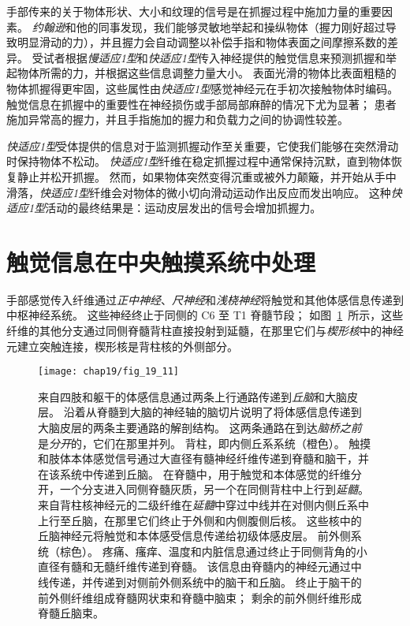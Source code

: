 手部传来的关于物体形状、大小和纹理的信号是在抓握过程中施加力量的重要因素。
\textit{约翰逊}和他的同事发现，我们能够灵敏地举起和操纵物体（握力刚好超过导致明显滑动的力），并且握力会自动调整以补偿手指和物体表面之间摩擦系数的差异。
受试者根据\textit{慢适应1型}和\textit{快适应1型}传入神经提供的触觉信息来预测抓握和举起物体所需的力，并根据这些信息调整力量大小。
表面光滑的物体比表面粗糙的物体抓握得更牢固，这些属性由\textit{快适应1型}感觉神经元在手初次接触物体时编码。
触觉信息在抓握中的重要性在神经损伤或手部局部麻醉的情况下尤为显著；
患者施加异常高的握力，并且手指施加的握力和负载力之间的协调性较差。


\textit{快适应1型}受体提供的信息对于监测抓握动作至关重要，它使我们能够在突然滑动时保持物体不松动。
\textit{快适应1型}纤维在稳定抓握过程中通常保持沉默，直到物体恢复静止并松开抓握。
然而，如果物体突然变得沉重或被外力颠簸，并开始从手中滑落，\textit{快适应1型}纤维会对物体的微小切向滑动运动作出反应而发出响应。
这种\textit{快适应1型}活动的最终结果是：运动皮层发出的信号会增加抓握力。



\section{触觉信息在中央触摸系统中处理}

手部感觉传入纤维通过\textit{正中神经}、\textit{尺神经}和\textit{浅桡神经}将触觉和其他体感信息传递到中枢神经系统。
这些神经终止于同侧的 C6 至 T1 脊髓节段；
如图~\ref{fig:19_11}~所示，这些纤维的其他分支通过同侧脊髓背柱直接投射到延髓，在那里它们与\textit{楔形核}中的神经元建立突触连接，楔形核是背柱核的外侧部分。


\begin{figure}[htbp]
	\centering
	\texttt{[image: chap19/fig\_19\_11]}
	\caption{来自四肢和躯干的体感信息通过两条上行通路传递到\textit{丘脑}和大脑皮层。
		沿着从脊髓到大脑的神经轴的脑切片说明了将体感信息传递到大脑皮层的两条主要通路的解剖结构。
		这两条通路在到达\textit{脑桥之前}是\textit{分开}的，它们在那里并列。
		背柱，即内侧丘系系统（橙色）。
		触摸和肢体本体感觉信号通过大直径有髓神经纤维传递到脊髓和脑干，并在该系统中传递到丘脑。
		在脊髓中，用于触觉和本体感觉的纤维分开，一个分支进入同侧脊髓灰质，另一个在同侧背柱中上行到\textit{延髓}。
		来自背柱核神经元的二级纤维在\textit{延髓}中穿过中线并在对侧内侧丘系中上行至丘脑，在那里它们终止于外侧和内侧腹侧后核。
		这些核中的丘脑神经元将触觉和本体感受信息传递给初级体感皮层。 前外侧系统（棕色）。
		疼痛、瘙痒、温度和内脏信息通过终止于同侧背角的小直径有髓和无髓纤维传递到脊髓。
		该信息由脊髓内的神经元通过中线传递，并传递到对侧前外侧系统中的脑干和丘脑。
		终止于脑干的前外侧纤维组成脊髓网状束和脊髓中脑束； 剩余的前外侧纤维形成脊髓丘脑束。}
	\label{fig:19_11}
\end{figure}



